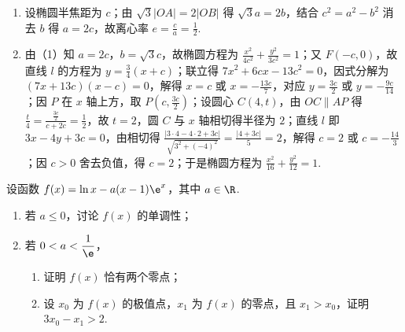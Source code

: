 \begin{solution}
\begin{enumerate}
\item 设椭圆半焦距为 \(c\)；由 \(\sqrt{3}\left|OA\right|=2\left|OB\right|\) 得 \(\sqrt{3}a=2b\)，结合 \(c^{2}=a^{2}-b^{2}\) 消去 \(b\) 得 \(a=2c\)，故离心率 \(e=\frac{c}{a}=\frac{1}{2}\).
\item 由（1）知 \(a=2c\)，\(b=\sqrt{3}c\)，故椭圆方程为 \(\frac{x^{2}}{4c^{2}}+\frac{y^{2}}{3c^{2}}=1\)；又 \(F\left(-c,0\right)\)，故直线 \(l\) 的方程为 \(y=\frac{3}{4}\left(x+c\right)\)；联立得 \(7x^{2}+6cx-13c^{2}=0\)，因式分解为 \(\left(7x+13c\right)\left(x-c\right)=0\)，解得 \(x=c\) 或 \(x=-\frac{13c}{7}\)，对应 \(y=\frac{3c}{2}\) 或 \(y=-\frac{9c}{14}\)；因 \(P\) 在 \(x\) 轴上方，取 \(P\left(c,\frac{3c}{2}\right)\)；设圆心 \(C\left(4,t\right)\)，由 \(OC\parallel AP\) 得 \(\frac{t}{4}=\frac{\frac{3c}{2}}{c+2c}=\frac{1}{2}\)，故 \(t=2\)，圆 \(C\) 与 \(x\) 轴相切得半径为 \(2\)；直线 \(l\) 即 \(3x-4y+3c=0\)，由相切得 \(\frac{\left|3\cdot 4-4\cdot 2+3c\right|}{\sqrt{3^{2}+\left(-4\right)^{2}}}=\frac{\left|4+3c\right|}{5}=2\)，解得 \(c=2\) 或 \(c=-\frac{14}{3}\)；因 \(c>0\) 舍去负值，得 \(c=2\)；于是椭圆方程为 \(\frac{x^{2}}{16}+\frac{y^{2}}{12}=1\).
\end{enumerate}
\end{solution}

\begin{problem}
设函数 \(f(x)=\ln x-a(x-1)\e^x\)，其中 \(a\in\R\).

\begin{enumerate}
\item 若 \(a\le0\)，讨论 \(f(x)\) 的单调性；
\item 若 \(0<a<\dfrac1\e\)，
\begin{enumerate}
\item 证明 \(f(x)\) 恰有两个零点；
\item 设 \(x_0\) 为 \(f(x)\) 的极值点，\(x_1\) 为 \(f(x)\) 的零点，且 \(x_1>x_0\)，证明 \(3x_0-x_1>2\).
\end{enumerate}
\end{enumerate}
\end{problem}

